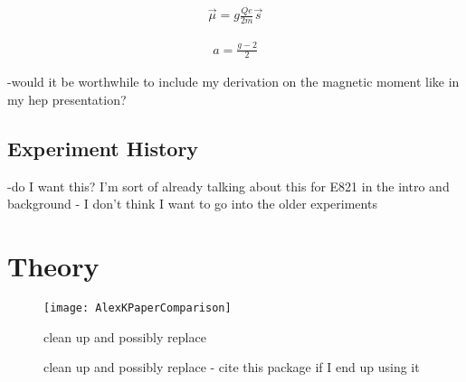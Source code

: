 		\begin{align} \label{eq:magneticmoment}
            \vec{\mu} = g \frac{Qe}{2m} \vec{s}
		\end{align}

		\begin{align} \label{eq:anamoly}
            a = \frac{g-2}{2}
		\end{align}


-would it be worthwhile to include my derivation on the magnetic moment like in my hep presentation?



\subsection{Experiment History}
\label{subsec:ExperimentHistory}

-do I want this? I'm sort of already talking about this for E821 in the intro and background - I don't think I want to go into the older experiments



\section{Theory}
\label{sec:Theory}

\begin{figure}[]
	\caption[AlexKPaperComparison]{clean up and possibly replace}	
	\centering
	\texttt{[image: AlexKPaperComparison]}
	\label{fig:AlexKPaperComparison}
\end{figure}



\begin{figure}[]
	\caption[testfeynmanpicture2]{clean up and possibly replace - cite this package if I end up using it}	
	\centering
{}
\end{figure}



